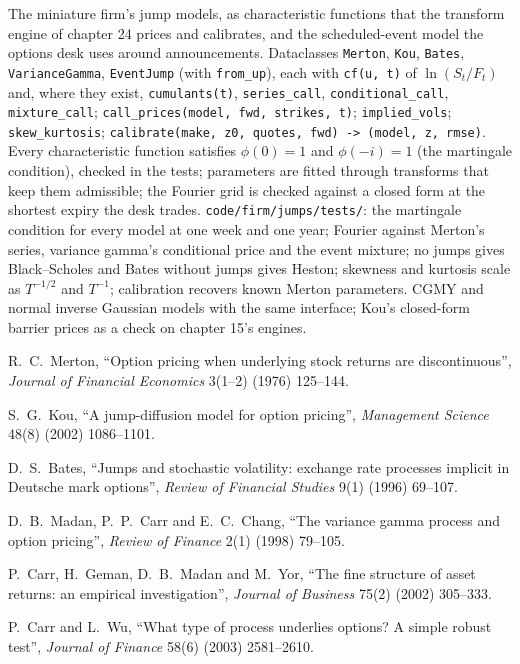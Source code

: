 \begin{build}
 The miniature firm's jump models, as characteristic functions that the transform engine of
chapter 24 prices and calibrates, and the scheduled-event model the options desk uses around announcements.
 Dataclasses \texttt{Merton}, \texttt{Kou}, \texttt{Bates}, \texttt{VarianceGamma},
\texttt{EventJump} (with \texttt{from\_up}), each with \texttt{cf(u, t)} of $\ln(S_t/F_t)$ and, where they exist,
\texttt{cumulants(t)}, \texttt{series\_call}, \texttt{conditional\_call}, \texttt{mixture\_call};
\texttt{call\_prices(model, fwd, strikes, t)}; \texttt{implied\_vols}; \texttt{skew\_kurtosis};
\texttt{calibrate(make, z0, quotes, fwd) -> (model, z, rmse)}.
 Every characteristic function satisfies $\phi(0)=1$ and $\phi(-i)=1$ (the martingale condition),
checked in the tests; parameters are fitted through transforms that keep them admissible; the Fourier grid is
checked against a closed form at the shortest expiry the desk trades.
 \texttt{code/firm/jumps/tests/}: the martingale condition for every model at one week
and one year; Fourier against Merton's series, variance gamma's conditional price and the event mixture; no
jumps gives Black--Scholes and Bates without jumps gives Heston; skewness and kurtosis scale as $T^{-1/2}$ and
$T^{-1}$; calibration recovers known Merton parameters.
 CGMY and normal inverse Gaussian models with the same interface; Kou's closed-form barrier
prices as a check on chapter 15's engines.
\end{build}

\begin{omsources}
\item R.~C.~Merton, ``Option pricing when underlying stock returns are discontinuous'', \emph{Journal of Financial
Economics} 3(1--2) (1976) 125--144.
\item S.~G.~Kou, ``A jump-diffusion model for option pricing'', \emph{Management Science} 48(8) (2002) 1086--1101.
\item D.~S.~Bates, ``Jumps and stochastic volatility: exchange rate processes implicit in Deutsche mark options'',
\emph{Review of Financial Studies} 9(1) (1996) 69--107.
\item D.~B.~Madan, P.~P.~Carr and E.~C.~Chang, ``The variance gamma process and option pricing'', \emph{Review of
Finance} 2(1) (1998) 79--105.
\item P.~Carr, H.~Geman, D.~B.~Madan and M.~Yor, ``The fine structure of asset returns: an empirical
investigation'', \emph{Journal of Business} 75(2) (2002) 305--333.
\item P.~Carr and L.~Wu, ``What type of process underlies options? A simple robust test'', \emph{Journal of
Finance} 58(6) (2003) 2581--2610.
\end{omsources}

